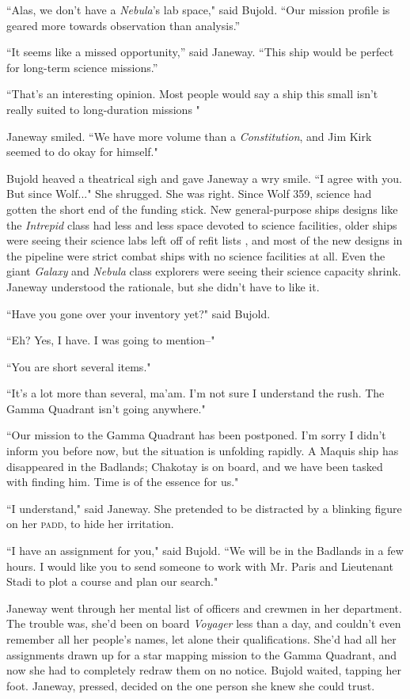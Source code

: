 \documentclass[twoside,letterpaper,12pt]{memoir}
\begin{document}
``Alas, we don’t have a \textit{Nebula}’s lab space," said Bujold. ``Our mission profile is geared more towards observation than analysis.''

``It seems like a missed opportunity,'' said Janeway. ``This ship would be perfect for long-term science missions.''

``That’s an interesting opinion. Most people would say a ship this small isn't really suited to long-duration missions "

Janeway smiled. ``We have more volume than a \textit{Constitution}, and Jim Kirk seemed to do okay for himself."

Bujold heaved a theatrical sigh and gave Janeway a wry smile. ``I agree with you. But since Wolf..." She shrugged. She was right. Since Wolf 359, science had gotten the short end of the funding stick. New general-purpose ships designs like the \textit{Intrepid }class had less and less space devoted to science facilities, older ships were seeing their science labs left off of refit lists , and most of the new designs in the pipeline were strict combat ships with no science facilities at all. Even the giant \textit{Galaxy} and \textit{Nebula} class explorers were seeing their science capacity shrink. Janeway understood the rationale, but she didn't have to like it.

``Have you gone over your inventory yet?" said Bujold.

``Eh? Yes, I have. I was going to mention--"

``You are short several items."

``It's a lot more than several, ma'am. I'm not sure I understand the rush. The Gamma Quadrant isn't going anywhere."

``Our mission to the Gamma Quadrant has been postponed. I'm sorry I didn't inform you before now, but the situation is unfolding rapidly. A Maquis ship has disappeared in the Badlands; Chakotay is on board, and we have been tasked with finding him. Time is of the essence for us."

``I understand," said Janeway. She pretended to be distracted by a blinking figure on her \textsc{padd}, to hide her irritation.

``I have an assignment for you," said Bujold. ``We will be in the Badlands in a few hours. I would like you to send someone to work with Mr. Paris and Lieutenant Stadi to plot a course and plan our search."

Janeway went through her mental list of officers and crewmen in her department. The trouble was, she'd been on board \textit{Voyager} less than a day, and couldn't even remember all her people's names, let alone their qualifications. She'd had all her assignments drawn up for a star mapping mission to the Gamma Quadrant, and now she had to completely redraw them on no notice. Bujold waited, tapping her foot. Janeway, pressed, decided on the one person she knew she could trust.
\end{document}
